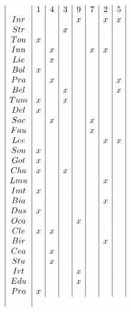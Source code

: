 $$\begin{array}{|c|c|c|c|c|c|c|c|}
\hline
    & 1 & 4 & 3 & 9 & 7 & 2 & 5 \\
\hline
Inr &   &   &   & x &   & x & x \\
\hline
Str &   &   & x &   &   &   &   \\
\hline
Tou & x &   &   &   &   &   &   \\
\hline
Inn &   & x &   &   & x & x &   \\
\hline
Lie &   & x &   &   &   &   &   \\
\hline
Bol & x &   &   &   &   &   &   \\
\hline
Pra &   & x &   &   &   &   & x \\
\hline
Bel &   &   & x &   &   &   & x \\
\hline
Tum & x &   & x &   &   &   &   \\
\hline
Del & x &   &   &   &   &   &   \\
\hline
Sac &   & x &   &   & x &   &   \\
\hline
Fau &   &   &   &   & x &   &   \\
\hline
Lee &   &   &   &   &   & x & x \\
\hline
Sou & x &   &   &   &   &   &   \\
\hline
Got & x &   &   &   &   &   &   \\
\hline
Cha & x &   & x &   &   &   &   \\
\hline
Lmu &   &   &   &   &   & x &   \\
\hline
Imt & x &   &   &   &   &   &   \\
\hline
Bia &   &   &   &   &   & x &   \\
\hline
Dus & x &   &   &   &   &   &   \\
\hline
Oca &   &   &   & x &   &   &   \\
\hline
Cle & x & x &   &   &   &   &   \\
\hline
Bir &   &   &   &   &   & x &   \\
\hline
Cea &   & x &   &   &   &   &   \\
\hline
Stu &   & x &   &   &   &   &   \\
\hline
Irt &   &   &   & x &   &   &   \\
\hline
Edu &   &   &   & x &   &   &   \\
\hline
Pro & x &   &   &   &   &   &   \\
\hline
\end{array}$$



